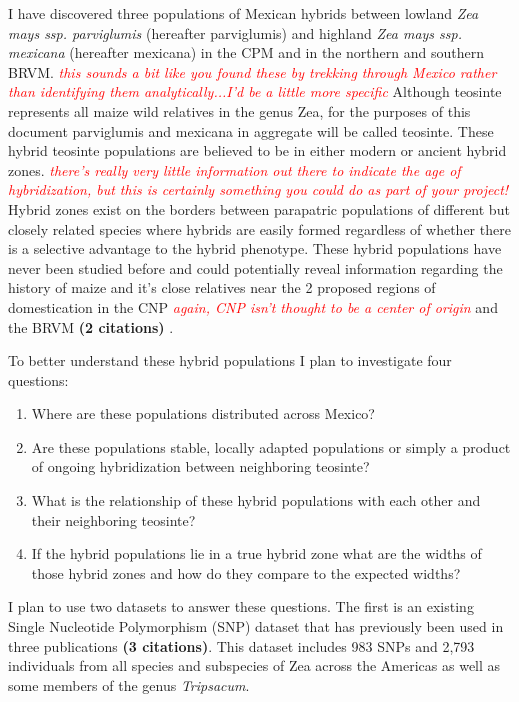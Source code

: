 \documentclass[12pt]{amsart}
\newcommand{\mbh}[1]{\textcolor{red}{ \emph{\scriptsize  #1}} }
\begin{document}
I have discovered three populations of Mexican hybrids between lowland \textit{Zea mays ssp. parviglumis} (hereafter parviglumis) and highland \textit{Zea mays ssp. mexicana} (hereafter mexicana) in the CPM and in the northern and southern BRVM. \mbh{this sounds a bit like you found these by trekking through Mexico rather than identifying them analytically...I'd be a little more specific}
Although teosinte represents all maize wild relatives in the genus {Zea}, for the purposes of this document parviglumis and mexicana in aggregate will be called teosinte.
These hybrid teosinte populations are believed to be in either modern or ancient hybrid zones.  \mbh{there's really very little information out there to indicate the age of hybridization, but this is certainly something you could do as part of your project!}
Hybrid zones exist on the borders between parapatric populations of different but closely related species where hybrids are easily formed regardless of whether there is a selective advantage to the hybrid phenotype.
These hybrid populations have never been studied before and could potentially reveal information regarding the history of maize and it's close relatives near the 2 proposed regions of domestication in the CNP \mbh{again, CNP isn't thought to be a center of origin} and the BRVM \textbf{(2 citations)} .

To better understand these hybrid populations I plan to investigate four questions: 
\begin{enumerate} 
	\item Where are these populations distributed across Mexico? 
	\item Are these populations stable, locally adapted populations or simply a product of ongoing hybridization between neighboring teosinte?
	\item What is the relationship of these hybrid populations with each other and their neighboring teosinte?
	\item If the hybrid populations lie in a true hybrid zone what are the widths of those hybrid zones and how do they compare to the expected widths?
\end{enumerate} 

I plan to use two datasets to answer these questions.  
The first is an existing Single Nucleotide Polymorphism (SNP) dataset that has previously been used in three publications \textbf{(3 citations)}.  
This dataset includes 983 SNPs and 2,793 individuals from all species and subspecies of Zea across the Americas as well as some members of the genus \emph{Tripsacum}.  
\end{document}
